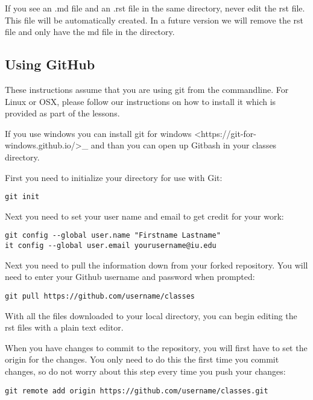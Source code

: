 If you see an .md file and an .rst file in the same directory, never
edit the rst file. This file will be automatically created. In a future
version we will remove the rst file and only have the md file in the
directory.

\subsection{Using GitHub}\label{using-github}

These instructions assume that you are using git from the commandline.
For Linux or OSX, please follow our instructions on how to install it
which is provided as part of the lessons.

If you use windows you can install
git for windows \textless{}https://git-for-windows.github.io/\textgreater{}\_
and than you can open up Gitbash in your classes directory.

First you need to initialize your directory for use with Git:

\begin{verbatim}
git init
\end{verbatim}

Next you need to set your user name and email to get credit for your
work:

\begin{verbatim}
git config --global user.name "Firstname Lastname"
it config --global user.email yourusername@iu.edu
\end{verbatim}

Next you need to pull the information down from your forked repository.
You will need to enter your Github username and password when prompted:

\begin{verbatim}
git pull https://github.com/username/classes
\end{verbatim}

With all the files downloaded to your local directory, you can begin
editing the rst files with a plain text editor.

When you have changes to commit to the repository, you will first have
to set the origin for the changes. You only need to do this the first
time you commit changes, so do not worry about this step every time you
push your changes:

\begin{verbatim}
git remote add origin https://github.com/username/classes.git
\end{verbatim}

